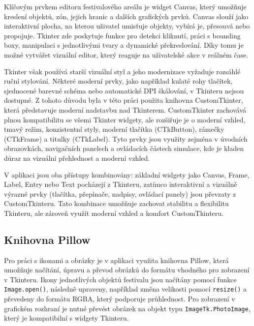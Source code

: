 \documentclass[
  program=itp,
  biblatex,
  figures=false,
  glossaries,
  index
]{kidiplom}
\begin{document}
Klíčovým prvkem editoru festivalového areálu je widget Canvas, který umožňuje kreslení objektů, zón, jejich hranic a dalších grafických prvků. Canvas slouží jako interaktivní plocha, na kterou uživatel umisťuje objekty, vybírá je, přesouvá nebo propojuje. Tkinter zde poskytuje funkce pro detekci kliknutí, práci s bounding boxy, manipulaci s jednotlivými tvary a dynamické překreslování. Díky tomu je možné vytvářet vizuální editor, který reaguje na uživatelské akce v reálném čase.

Tkinter však používá starší vizuální styl a jeho modernizace vyžaduje rozsáhlé ruční stylování. Některé moderní prvky, jako například kulaté rohy tlačítek, sjednocené barevné schéma nebo automatické DPI škálování, v Tkinteru nejsou dostupné. Z tohoto důvodu byla v této práci použita knihovna CustomTkinter, která představuje moderní nadstavbu nad Tkinterem. CustomTkinter zachovává plnou kompatibilitu se všemi Tkinter widgety, ale rozšiřuje je o moderní vzhled, tmavý režim, konzistentní styly, moderní tlačítka (CTkButton), rámečky (CTkFrame) a titulky (CTkLabel). Tyto prvky jsou využity zejména v úvodních obrazovkách, navigačních panelech a ovládacích částech simulace, kde je kladen důraz na vizuální přehlednost a moderní vzhled.

V aplikaci jsou oba přístupy kombinovány: základní widgety jako Canvas, Frame, Label, Entry nebo Text pocházejí z Tkinteru, zatímco interaktivní a vizuálně výrazné prvky (tlačítka, přepínače, nadpisy, ovládací panely) jsou převzaty z CustomTkinteru. Tato kombinace umožňuje zachovat stabilitu a flexibilitu Tkinteru, ale zároveň využít moderní vzhled a komfort CustomTkinteru.







\subsection{Knihovna Pillow}

Pro práci s ikonami a obrázky je v aplikaci využita knihovna Pillow, která umožňuje načítání, úpravu a převod obrázků do formátu vhodného pro zobrazení v Tkinteru. Ikony jednotlivých objektů festivalu jsou načítány pomocí funkce \texttt{Image.open()}, následně upraveny, například změna velikosti pomocí \texttt{resize()} a převedeny do formátu RGBA, který podporuje průhlednost. Pro zobrazení v grafickém rozhraní je nutné převést obrázek na objekt typu \texttt{ImageTk.PhotoImage}, který je kompatibilní s widgety Tkinteru.
\end{document}
